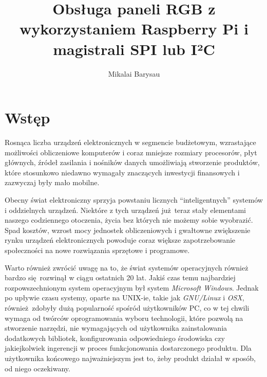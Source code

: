 \documentclass[eng,printmode]{mgr}
\title{Obsługa paneli RGB z wykorzystaniem Raspberry Pi i magistrali SPI lub I²C}
\author{Mikalai Barysau}
\begin{document}
\renewcommand{\bibname}{Literatura}

\maketitle

\tableofcontents %

\chapter*{Wstęp}

Rosnąca liczba urządzeń elektronicznych w segmencie budżetowym, wzrastające możliwości obliczeniowe komputerów i coraz mniejsze rozmiary procesorów, płyt głównych, źródeł zasilania i nośników danych umożliwiają stworzenie produktów, które stosunkowo niedawno wymagały znaczących inwestycji finansowych i zazwyczaj były mało mobilne. 

Obecny świat elektroniczny sprzyja powstaniu licznych ``inteligentnych'' systemów i oddzielnych urządzeń. Niektóre z tych urządzeń już teraz stały elementami naszego codziennego otoczenia, życia bez których nie możemy sobie wyobrazić. Spad kosztów, wzrost mocy jednostek obliczeniowych i gwałtowne zwiększenie rynku urządzeń elektronicznych powoduje coraz większe zapotrzebowanie społeczności na nowe rozwiązania sprzętowe i programowe. 

Warto również zwrócić uwagę na to, że świat systemów operacyjnych również bardzo się rozwinął w ciągu ostatnich 20 lat. Jakiś czas temu najbardziej rozpowszechnionym system operacyjnym był system \emph{Microsoft Windows}. Jednak po upływie czasu systemy, oparte na UNIX-ie, takie jak \emph{GNU/Linux} i \emph{OSX}, również zdobyły dużą popularność spośród użytkowników PC, co w tej chwili wymaga od twórców oprogramowania wyboru technologii, które pozwolą na stworzenie narzędzi, nie wymagających od użytkownika zainstalowania dodatkowych bibliotek, konfigurowania odpowiedniego środowiska czy jakiejkolwiek ingerencji w proces funkcjonowania dostarczonego produktu. Dla użytkownika końcowego najważniejszym jest to, żeby produkt działał w sposób, od niego oczekiwany. 
\end{document}
